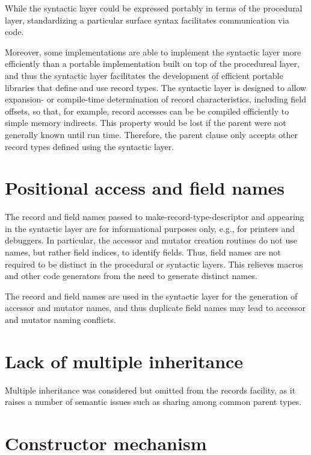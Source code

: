 \documentclass[twoside,twocolumn]{algol60}
\begin{document}
While the syntactic layer could be expressed portably in terms of the
procedural layer, standardizing a particular surface syntax
facilitates communication via code.

Moreover, some implementations are able to implement the syntactic
layer more efficiently than
a portable implementation built on top of the procedureal layer, and
thus the syntactic layer facilitates the development of efficient portable libraries
that define and use record types.  The syntactic layer is designed to
allow expansion- or compile-time determination of record
characteristics, including field offsets, so that, for example, record
accesses can be be compiled efficiently to simple memory indirects.
This property would be lost if the parent were not generally known
until run time.  Therefore, the {\cf parent} clause only accepts
other record types defined using the syntactic layer.

\section{Positional access and field names}

The record and field names passed to {\cf make-record-type-descriptor}
and appearing in the syntactic layer are for informational purposes
only, e.g., for printers and debuggers.  In particular, the accessor
and mutator creation routines do not use names, but rather field
indices, to identify fields.
Thus, field names are not required to be distinct in the procedural or
syntactic layers.  This relieves macros and other code generators from
the need to generate distinct names.

The record and field names are used in the syntactic layer for the
generation of accessor and mutator names, and thus duplicate field names
may lead to accessor and mutator naming conflicts.

\section{Lack of multiple inheritance}

Multiple inheritance was considered but omitted from the records
facility, as it raises a number of semantic issues such as sharing
among common parent types.

\section{Constructor mechanism}
\end{document}
